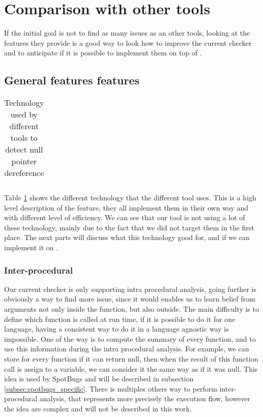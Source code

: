 \section{Comparison with other tools}
\label{sec:comparison}

If the initial goal is not to find as many issues as an other tools, looking at the features they provide is a good way to look how to improve the current checker and to anticipate if it is possible to implement them on top of \slang.


\subsection{General features features}
\label{subsec:general_features}

\begin{table}[h]
	\centering
	\caption{Technology used by different tools to detect null pointer dereference}
	\label{table:tools_features}
	\begin{tabular}{|c|c|}
		\hline
	\end{tabular}
\end{table}

Table \ref{table:tools_features} shows the different technology that the different tool uses. 
This is a high level description of the feature, they all implement them in their own way and with different level of efficiency. 
We can see that our tool is not using a lot of these technology, mainly due to the fact that we did not target them in the first place. 
The next parts will discuss what this technology good for, and if we can implement it on \slang.


\subsubsection{Inter-procedural}
\label{subsubsec:inter_procedrual}

Our current checker is only supporting intra procedural analysis, going further is obviously a way to find more issue, since it would enables us to learn belief from arguments not only inside the function, but also outside. 
The main difficulty is to define which function is called at run time, if it is possible to do it for one language, having a consistent way to do it in a language agnostic way is impossible. One of the way is to compute the summary of every function, and to use this information during the intra procedural analysis. 
For example, we can store for every function if it can return null, then when the result of this function call is assign to a variable, we can consider it the same way as if it was null. 
This idea is used by SpotBugs and will be described in subsection \ref{subsec:spotbugs_specific}. 
There is multiples others way to perform inter-procedural analysis, that represents more precisely the execution flow, however the idea are complex and will not be described in this work.

